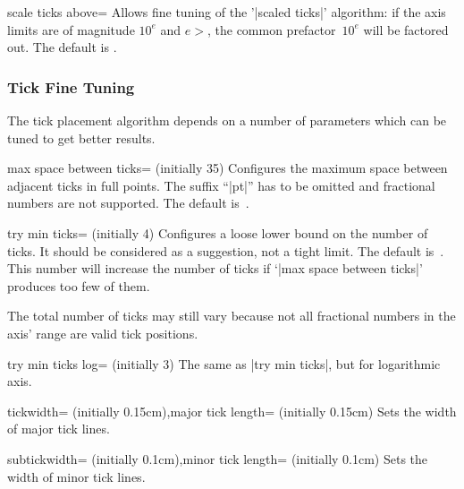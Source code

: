 \begin{pgfplotskey}{scale ticks above=}
Allows fine tuning of the '|scaled ticks|' algorithm: if the axis limits are of magnitude $10^e$ and $e>$, the common prefactor~$10^e$ will be factored out. The default is
\makeatletter
\pgfplots@scale@ticks@above@exponent
\makeatother.
\end{pgfplotskey}


\subsubsection{Tick Fine Tuning}
The tick placement algorithm depends on a number of parameters which can be tuned to get better results.
\begin{pgfplotskey}{max space between ticks= (initially 35)}
\label{maxspacebetweenticks}
	Configures the maximum space between adjacent ticks in full points. The suffix ``|pt|'' has to be omitted and fractional numbers are not supported. The default is~\axisdefaulttickwidth.
\end{pgfplotskey}

\begin{pgfplotskey}{try min ticks= (initially 4)}
	Configures a loose lower bound on the number of ticks. It should be considered as a suggestion, not a tight limit. The default is~\axisdefaulttryminticks. This number will increase the number of ticks if `|max space between ticks|' produces too few of them.

	The total number of ticks may still vary because not all fractional numbers in the axis' range are valid tick positions.
\end{pgfplotskey}

\begin{pgfplotskey}{try min ticks log= (initially 3)}
	The same as |try min ticks|, but for logarithmic axis.
\end{pgfplotskey}

\begin{pgfplotskeylist}{tickwidth= (initially 0.15cm),major tick length= (initially 0.15cm)}
	Sets the width of major tick lines.
\end{pgfplotskeylist}

\begin{pgfplotskeylist}{subtickwidth= (initially 0.1cm),minor tick length= (initially 0.1cm)}
	Sets the width of minor tick lines.
\end{pgfplotskeylist}

